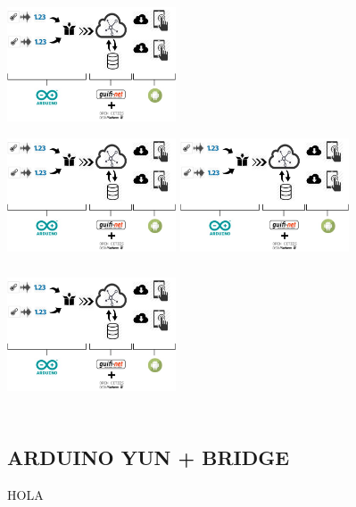 \documentclass[compress,red]{beamer}
\begin{document}
		\begin{frame}
			\begin{columns}[t]
				\centering
				\includegraphics[width=5cm,height=3.5cm]{../Final_Report/Figures/reportGeneralView.jpg}\\
				\includegraphics[width=5cm,height=4cm]{../Final_Report/Figures/reportGeneralView.jpg}
				\centering
				\includegraphics[width=5cm,height=4cm]{../Final_Report/Figures/reportGeneralView.jpg}\\
				\includegraphics[width=5cm,height=4cm]{../Final_Report/Figures/reportGeneralView.jpg}
			\end{columns}
		\end{frame}
		
	\subsection{ARDUINO YUN + BRIDGE}
		HOLA
		
\end{document}

